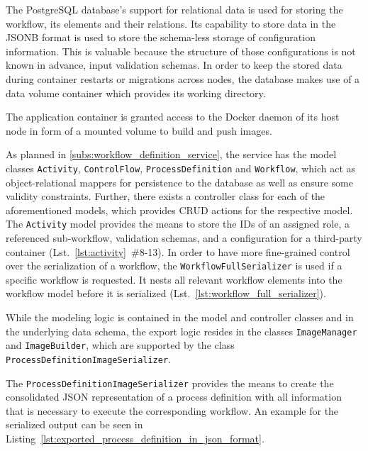     The PostgreSQL database's support for relational data is used for storing the workflow, its elements and their relations. Its capability to store data in the JSONB format is used to store the schema-less storage of configuration information. This is valuable because the structure of those configurations is not known in advance, \eg input validation schemas.
    In order to keep the stored data during container restarts or migrations across nodes, the database makes use of a data volume container which provides its working directory.

    The application container is granted access to the Docker daemon of its host node in form of a mounted volume to build and push images.

    As planned in \ref{subs:workflow_definition_service}, the service has the model classes \texttt{Activity}, \texttt{ControlFlow}, \texttt{ProcessDefinition} and \texttt{Workflow}, which act as object-relational mappers for persistence to the database as well as ensure some validity constraints. Further, there exists a controller class for each of the aforementioned models, which provides \ac{CRUD} actions for the respective model. The \texttt{Activity} model provides the means to store the \acp{ID} of an assigned role, a referenced sub-workflow, validation schemas, and a configuration for a third-party container (Lst.~\ref{lst:activity}~\#8-13). In order to have more fine-grained control over the serialization of a workflow, the \texttt{WorkflowFullSerializer} is used if a specific workflow is requested. It nests all relevant workflow elements into the workflow model before it is serialized (Lst.~\ref{lst:workflow_full_serializer}).

    While the modeling logic is contained in the model and controller classes and in the underlying data schema, the export logic resides in the classes \texttt{ImageManager} and \texttt{ImageBuilder}, which are supported by the class \texttt{ProcessDefinitionImageSerializer}.

    The \texttt{ProcessDefinitionImageSerializer} provides the means to create the consolidated JSON representation of a process definition with all information that is necessary to execute the corresponding workflow. An example for the serialized output can be seen in Listing~\ref{lst:exported_process_definition_in_json_format}.

